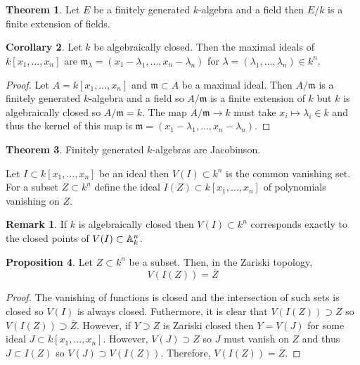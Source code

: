 \documentclass[12pt]{extarticle}
\theoremstyle{definition}
\newtheorem{theorem}{Theorem}[section]
\newtheorem{proposition}[theorem]{Proposition}
\newtheorem{corollary}[theorem]{Corollary}
\newtheorem{remark}{Remark}
\newenvironment{definition}[1][Definition:]{\begin{trivlist}
\item[\hskip \labelsep {\bfseries #1}]}{\end{trivlist}}
\newcommand{\m}{\mathfrak{m}}
\begin{document}
\begin{theorem}
Let $E$ be a finitely generated $k$-algebra and a field then $E / k$ is a finite extension of fields.
\end{theorem}

\begin{corollary}
Let $k$ be algebraically closed. Then the maximal ideals of $k[x_1, \dots, x_n]$ are $\m_\lambda = (x_1 - \lambda_1, \dots, x_n - \lambda_n)$ for $\lambda = (\lambda_1, \dots, \lambda_n) \in k^n$.
\end{corollary}

\begin{proof}
Let $A = k[x_1, \dots, x_n]$ and $\m \subset A$ be a maximal ideal. Then $A / \m$ is a finitely generated $k$-algebra and a field so $A / \m$ is a finite extension of $k$ but $k$ is algebraically closed so $A / \m = k$. The map $A / \m \to k$ must take $x_i \mapsto \lambda_i \in k$ and thus the kernel of this map is $\m = (x_1 - \lambda_1, \dots, x_n - \lambda_n)$. 
\end{proof}

\begin{theorem}
Finitely generated $k$-algebras are Jacobinson.
\end{theorem}

\begin{definition}
Let $I \subset k[x_1, \dots, x_n]$ be an ideal then $V(I) \subset k^n$ is the common vanishing set. For a subset $Z \subset k^n$ define the ideal $I(Z) \subset k[x_1, \dots, x_n]$ of polynomials vanishing on $Z$.
\end{definition}

\begin{remark}
If $k$ is algebraically closed then $V(I) \subset k^n$ corresponds exactly to the closed points of $V(I) \subset \mathbb{A}^n_k$. 
\end{remark}

\begin{proposition}
Let $Z \subset k^n$ be a subset. Then, in the Zariski topology,
\[ V(I(Z)) = \overline{Z} \]
\end{proposition}

\begin{proof}
The vanishing of functions is closed and the intersection of such sets is closed so $V(I)$ is always closed. Futhermore, it is clear that $V(I(Z)) \supset Z$ so $V(I(Z)) \supset \overline{Z}$. However, if $Y \supset Z$ is Zariski closed then $Y = V(J)$ for some ideal $J \subset k[x_1, \dots, x_n]$. However, $V(J) \supset Z$ so $J$ must vanish on $Z$ and thus $J \subset I(Z)$ so $V(J) \supset V(I(Z))$. Therefore, $V(I(Z)) = \overline{Z}$. 
\end{proof}
\end{document}
